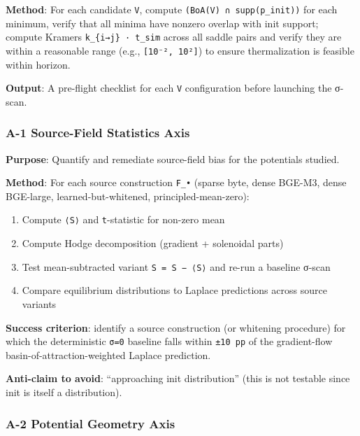 \documentclass[
]{article}
\providecommand{\tightlist}{%
  \setlength{\itemsep}{0pt}\setlength{\parskip}{0pt}}
\begin{document}
\textbf{Method}: For each candidate \texttt{V}, compute
\texttt{(BoA(V)\ ∩\ supp(p\_init))} for each minimum, verify that all
minima have nonzero overlap with init support; compute Kramers
\texttt{k\_\{i→j\}\ ·\ t\_sim} across all saddle pairs and verify they
are within a reasonable range (e.g., \texttt{{[}10⁻²,\ 10²{]}}) to
ensure thermalization is feasible within horizon.

\textbf{Output}: A pre-flight checklist for each \texttt{V}
configuration before launching the σ-scan.

\hypertarget{a-1-source-field-statistics-axis}{%
\subsubsection{A-1 Source-Field Statistics
Axis}\label{a-1-source-field-statistics-axis}}

\textbf{Purpose}: Quantify and remediate source-field bias for the
potentials studied.

\textbf{Method}: For each source construction \texttt{F\_•} (sparse
byte, dense BGE-M3, dense BGE-large, learned-but-whitened,
principled-mean-zero):

\begin{enumerate}
\def\labelenumi{\arabic{enumi}.}
\tightlist
\item
  Compute \texttt{⟨S⟩} and \texttt{t}-statistic for non-zero mean
\item
  Compute Hodge decomposition (gradient + solenoidal parts)
\item
  Test mean-subtracted variant
  \texttt{S\textquotesingle{}\ =\ S\ −\ ⟨S⟩} and re-run a baseline
  σ-scan
\item
  Compare equilibrium distributions to Laplace predictions across source
  variants
\end{enumerate}

\textbf{Success criterion}: identify a source construction (or whitening
procedure) for which the deterministic \texttt{σ=0} baseline falls
within \texttt{±10\ pp} of the gradient-flow
basin-of-attraction-weighted Laplace prediction.

\textbf{Anti-claim to avoid}: ``approaching init distribution'' (this is
not testable since init is itself a distribution).

\hypertarget{a-2-potential-geometry-axis}{%
\subsubsection{A-2 Potential Geometry
Axis}\label{a-2-potential-geometry-axis}}
\end{document}
